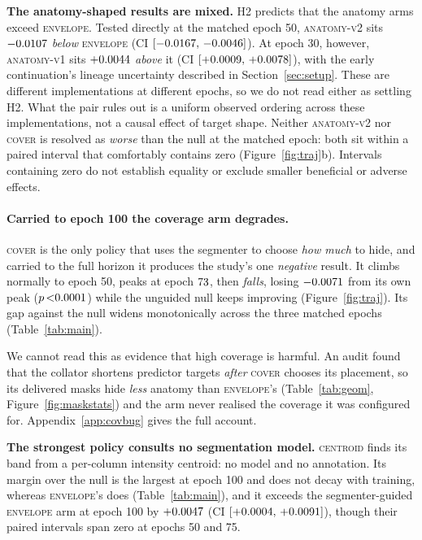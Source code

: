 \documentclass{article}
\newcommand{\ArmBest}{\textsc{centroid}}
\begin{document}
\textbf{The anatomy-shaped results are mixed.} H2 predicts that the anatomy arms exceed
\textsc{envelope}. Tested directly at the matched epoch 50, \textsc{anatomy-v2}
sits $-0.0107$ \emph{below} \textsc{envelope} (CI
$[-0.0167,\,-0.0046]$). At epoch 30, however, \textsc{anatomy-v1} sits
$+0.0044$ \emph{above} it (CI
$[+0.0009,\,+0.0078]$), with the early continuation's lineage
uncertainty described in Section~\ref{sec:setup}. These are different implementations at
different epochs, so we do not read either as settling H2. What the pair rules
out is a uniform observed ordering across these implementations, not a causal
effect of target shape. Neither \textsc{anatomy-v2} nor \textsc{cover} is resolved as
\emph{worse} than the null at the
matched epoch: both sit within a paired interval that comfortably contains zero
(Figure~\ref{fig:traj}b). Intervals containing zero do not establish equality
or exclude smaller beneficial or adverse effects.

\paragraph{Carried to epoch 100 the coverage arm degrades.}
\textsc{cover} is the only policy that uses the segmenter to choose \emph{how
much} to hide, and carried to the full horizon it produces the study's one
\emph{negative} result. It climbs normally to epoch 50, peaks at epoch
$73$, then \emph{falls}, losing $-0.0071$ from its own
peak ($p\,\DCoverPeakToHundredP$) while the unguided null keeps improving
(Figure~\ref{fig:traj}). Its gap against the null widens monotonically across the
three matched epochs (Table~\ref{tab:main}).

We cannot read this as evidence that high coverage is harmful. An audit found
that the collator shortens predictor targets \emph{after} \textsc{cover} chooses
its placement, so its delivered masks hide \emph{less} anatomy than
\textsc{envelope}'s (Table~\ref{tab:geom}, Figure~\ref{fig:maskstats}) and the
arm never realised the coverage it was configured for.
Appendix~\ref{app:covbug} gives the full account.

\textbf{The strongest policy consults no segmentation model.} \ArmBest{} finds
its band from a per-column intensity centroid: no model and no annotation. Its
margin over the null is the largest at epoch 100 and does not decay with
training, whereas \textsc{envelope}'s does
(Table~\ref{tab:main}), and it exceeds the segmenter-guided \textsc{envelope} arm
at epoch 100 by $+0.0047$ (CI $[+0.0004,\,+0.0091]$),
though their paired intervals span zero at epochs 50 and 75.
\end{document}
